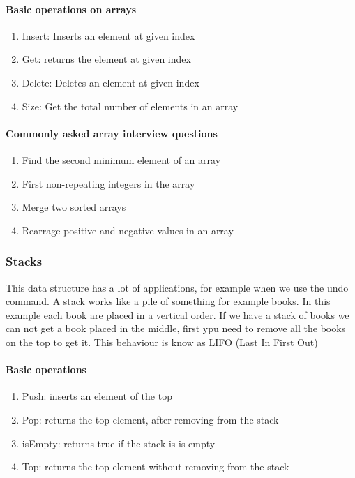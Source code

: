 \paragraph{Basic operations on arrays}

\begin{enumerate}
    \item { Insert: Inserts an element at given index }
    \item { Get: returns the element at given index }
    \item { Delete: Deletes an element at given index }
    \item { Size: Get the total number of elements in an array }
\end{enumerate}

\paragraph{Commonly asked array interview questions}
\begin{enumerate}
    \item { Find the second minimum element of an array }
    \item { First non-repeating integers in the array }
    \item { Merge two sorted arrays }
    \item { Rearrage positive and negative values in an array }
\end{enumerate}

\subsubsection{Stacks}
This data structure has a lot of applications, for example when we use the undo command.
A stack works like a pile of something for example books. In this example each book are placed in a vertical order. If we have a stack of books we can not get a book placed in the middle, first ypu need to remove all the books on the top to get it.
This behaviour is know as LIFO (Last In First Out) 

\paragraph{Basic operations}
\begin{enumerate}
    \item { Push: inserts an element of the top }
    \item { Pop: returns the top element, after removing from the stack }
    \item { isEmpty: returns true if the stack is is empty }
    \item { Top: returns the top element without removing from the stack }
\end{enumerate}

